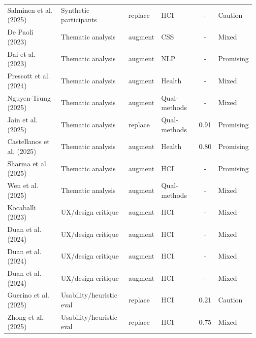 \begin{longtable}{@{}l l l l c l@{}}
Salminen et al. (2025) & Synthetic participants & replace & HCI & - & Caution \\
De Paoli (2023) & Thematic analysis & augment & CSS & - & Mixed \\
Dai et al. (2023) & Thematic analysis & augment & NLP & - & Promising \\
Prescott et al. (2024) & Thematic analysis & augment & Health & - & Mixed \\
Nguyen-Trung (2025) & Thematic analysis & augment & Qual-methods & - & Mixed \\
Jain et al. (2025) & Thematic analysis & replace & Qual-methods & 0.91 & Promising \\
Castellanos et al. (2025) & Thematic analysis & augment & Health & 0.80 & Promising \\
Sharma et al. (2025) & Thematic analysis & augment & HCI & - & Promising \\
Wen et al. (2025) & Thematic analysis & augment & Qual-methods & - & Mixed \\
Kocaballi (2023) & UX/design critique & augment & HCI & - & Mixed \\
Duan et al. (2024) & UX/design critique & augment & HCI & - & Mixed \\
Duan et al. (2024) & UX/design critique & augment & HCI & - & Mixed \\
Duan et al. (2024) & UX/design critique & augment & HCI & - & Mixed \\
Guerino et al. (2025) & Usability/heuristic eval & replace & HCI & 0.21 & Caution \\
Zhong et al. (2025) & Usability/heuristic eval & replace & HCI & 0.75 & Mixed \\
\bottomrule
\end{longtable}